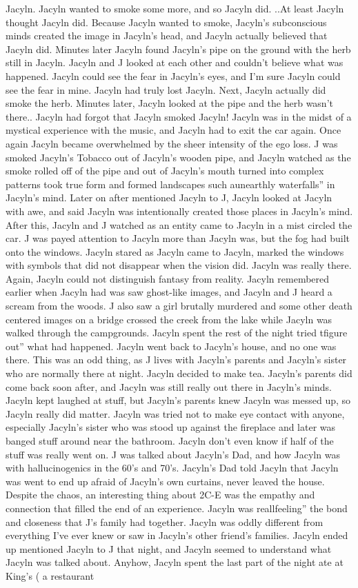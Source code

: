 \documentclass[12pt]{book}
\begin{document}
Jacyln. Jacyln wanted to smoke some more, and so Jacyln did. ..At least Jacyln thought Jacyln did. Because Jacyln wanted to smoke, Jacyln's subconscious minds created the image in Jacyln's head, and Jacyln actually believed that Jacyln did. Minutes later Jacyln found Jacyln's pipe on the ground with the herb still in Jacyln. Jacyln and J looked at each other and couldn't believe what was happened. Jacyln could see the fear in Jacyln's eyes, and I'm sure Jacyln could see the fear in mine. Jacyln had truly lost Jacyln. Next, Jacyln actually did smoke the herb. Minutes later, Jacyln looked at the pipe and the herb wasn't there.. Jacyln had forgot that Jacyln smoked Jacyln! Jacyln was in the midst of a mystical experience with the music, and Jacyln had to exit the car again. Once again Jacyln became overwhelmed by the sheer intensity of the ego loss. J was smoked Jacyln's Tobacco out of Jacyln's wooden pipe, and Jacyln watched as the smoke rolled off of the pipe and out of Jacyln's mouth turned into complex patterns took true form and formed landscapes such aunearthly waterfalls'' in Jacyln's mind. Later on after mentioned Jacyln to J, Jacyln looked at Jacyln with awe, and said Jacyln was intentionally created those places in Jacyln's mind. After this, Jacyln and J watched as an entity came to Jacyln in a mist circled the car. J was payed attention to Jacyln more than Jacyln was, but the fog had built onto the windows. Jacyln stared as Jacyln came to Jacyln, marked the windows with symbols that did not disappear when the vision did. Jacyln was really there. Again, Jacyln could not distinguish fantasy from reality. Jacyln remembered earlier when Jacyln had was saw ghost-like images, and Jacyln and J heard a scream from the woods. J also saw a girl brutally murdered and some other death centered images on a bridge crossed the creek from the lake while Jacyln was walked through the campgrounds. Jacyln spent the rest of the night tried tfigure out'' what had happened. Jacyln went back to Jacyln's house, and no one was there. This was an odd thing, as J lives with Jacyln's parents and Jacyln's sister who are normally there at night. Jacyln decided to make tea. Jacyln's parents did come back soon after, and Jacyln was still really out there in Jacyln's minds. Jacyln kept laughed at stuff, but Jacyln's parents knew Jacyln was messed up, so Jacyln really did matter. Jacyln was tried not to make eye contact with anyone, especially Jacyln's sister who was stood up against the fireplace and later was banged stuff around near the bathroom. Jacyln don't even know if half of the stuff was really went on. J was talked about Jacyln's Dad, and how Jacyln was with hallucinogenics in the 60's and 70's. Jacyln's Dad told Jacyln that Jacyln was went to end up afraid of Jacyln's own curtains, never leaved the house. Despite the chaos, an interesting thing about 2C-E was the empathy and connection that filled the end of an experience. Jacyln was reallfeeling'' the bond and closeness that J's family had together. Jacyln was oddly different from everything I've ever knew or saw in Jacyln's other friend's families. Jacyln ended up mentioned Jacyln to J that night, and Jacyln seemed to understand what Jacyln was talked about. Anyhow, Jacyln spent the last part of the night ate at King's ( a restaurant 
\end{document}
